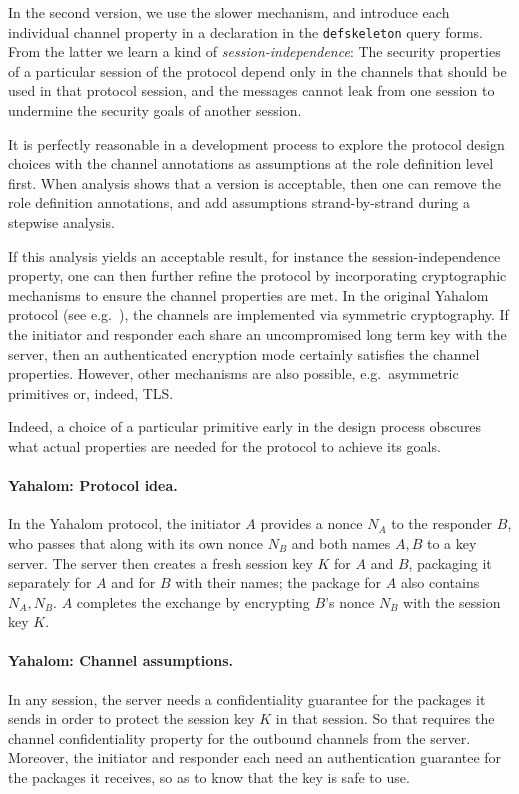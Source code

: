 In the second version, we use the slower mechanism, and introduce each
individual channel property in a declaration in the \verb|defskeleton|
query forms.  From the latter we learn a kind of
\emph{session-independence\/}:  The security properties of a
particular session of the protocol depend only in the channels that
should be used in that protocol session, and the messages cannot leak
from one session to undermine the security goals of another session.

It is perfectly reasonable in a development process to explore the
protocol design choices with the channel annotations as assumptions at
the role definition level first.  When analysis shows that a version
is acceptable, then one can remove the role definition annotations,
and add assumptions strand-by-strand during a stepwise analysis.

If this analysis yields an acceptable result, for instance the
session-independence property, one can then further refine the
protocol by incorporating cryptographic mechanisms to ensure the
channel properties are met.  In the original Yahalom protocol (see
e.g.~\cite{Paulson97c}), the channels are implemented via symmetric
cryptography.  If the initiator and responder each share an
uncompromised long term key with the server, then an authenticated
encryption mode certainly satisfies the channel properties.  However,
other mechanisms are also possible, e.g.~asymmetric primitives or,
indeed, TLS.

Indeed, a choice of a particular primitive early in the design process
obscures what actual properties are needed for the protocol to achieve
its goals.

\paragraph{Yahalom:  Protocol idea.}  In the Yahalom protocol, the
initiator $A$ provides a nonce $N_A$ to the responder $B$, who passes
that along with its own nonce $N_B$ and both names $A,B$ to a key
server.  The server then creates a fresh session key $K$ for $A$ and
$B$, packaging it separately for $A$ and for $B$ with their names; the
package for $A$ also contains $N_A,N_B$.  $A$ completes the exchange
by encrypting $B$'s nonce $N_B$ with the session key $K$.

\paragraph{Yahalom:  Channel assumptions.}  In any session, the server
needs a confidentiality guarantee for the packages it sends in order
to protect the session key $K$ in that session.  So that requires the
channel confidentiality property for the outbound channels from the
server.  Moreover, the initiator and responder each need an
authentication guarantee for the packages it receives, so as to know
that the key is safe to use.


